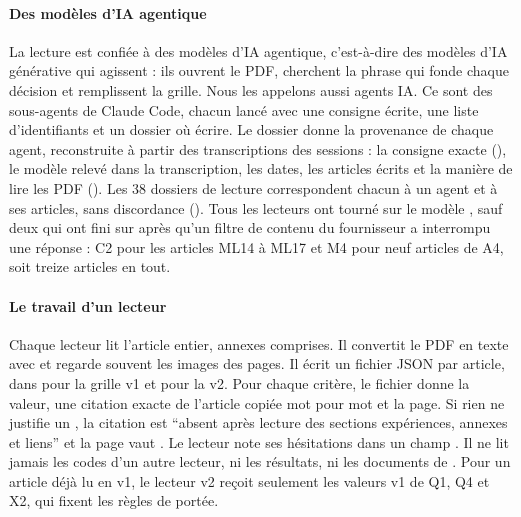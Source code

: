 \paragraph{Des modèles d'IA agentique}
La lecture est confiée à des modèles d'IA agentique, c'est-à-dire des modèles d'IA générative qui agissent : ils ouvrent le PDF, cherchent la phrase qui fonde chaque décision et remplissent la grille. Nous les appelons aussi agents IA. Ce sont des sous-agents de Claude Code, chacun lancé
avec une consigne écrite, une liste d'identifiants et un dossier où écrire. Le dossier
 donne la provenance de chaque agent, reconstruite à partir des
transcriptions des sessions : la consigne exacte (), le modèle
relevé dans la transcription, les dates, les articles écrits et la manière de lire les PDF
(). Les 38 dossiers de lecture correspondent chacun à un agent et à ses articles,
sans discordance (). Tous les lecteurs ont tourné sur le modèle
, sauf deux qui ont fini sur  après qu'un filtre de contenu
du fournisseur a interrompu une réponse : C2 pour les articles ML14 à ML17 et M4 pour neuf articles de
A4, soit treize articles en tout.

\paragraph{Le travail d'un lecteur}
Chaque lecteur lit l'article entier, annexes comprises. Il convertit le PDF en texte avec
 et regarde souvent les images des pages. Il écrit un fichier JSON par article, dans
 pour la grille v1 et  pour la v2. Pour
chaque critère, le fichier donne la valeur, une citation exacte de l'article copiée mot pour mot et la
page. Si rien ne justifie un , la citation est \enquote{absent après lecture des sections
expériences, annexes et liens} et la page vaut . Le lecteur note ses hésitations dans un
champ . Il ne lit jamais les codes d'un autre lecteur, ni les résultats, ni les documents
de . Pour un article déjà lu en v1, le lecteur v2 reçoit seulement les valeurs v1 de Q1,
Q4 et X2, qui fixent les règles de portée.

